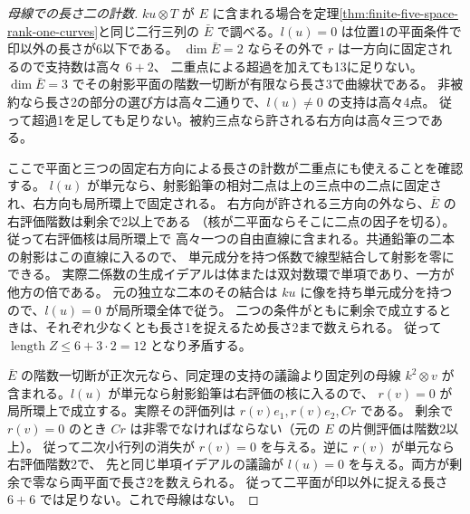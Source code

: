 \begin{proof}[母線での長さ二の計数]
$ku\otimes T$ が $E$ に含まれる場合を定理\ref{thm:finite-five-space-rank-one-curves}と同じ二行三列の
$\bar E$ で調べる。$l(u)=0$ は位置1の平面条件で印以外の長さが6以下である。
$\dim\bar E=2$ ならその外で $r$ は一方向に固定されるので支持数は高々 $6+2$、
二重点による超過を加えても13に足りない。
$\dim\bar E=3$ でその射影平面の階数一切断が有限なら長さ3で曲線状である。
非被約なら長さ2の部分の選び方は高々二通りで、$l(u)\ne0$ の支持は高々4点。
従って超過1を足しても足りない。被約三点なら許される右方向は高々三つである。

ここで平面と三つの固定右方向による長さの計数が二重点にも使えることを確認する。
$l(u)$ が単元なら、射影鉛筆の相対二点は上の三点中の二点に固定され、右方向も局所環上で固定される。
右方向が許される三方向の外なら、$\bar E$ の右評価階数は剰余で2以上である
（核が二平面ならそこに二点の因子を切る）。従って右評価核は局所環上で
高々一つの自由直線に含まれる。共通鉛筆の二本の射影はこの直線に入るので、
単元成分を持つ係数で線型結合して射影を零にできる。
実際二係数の生成イデアルは体または双対数環で単項であり、一方が他方の倍である。
元の独立な二本のその結合は $ku$ に像を持ち単元成分を持つので、$l(u)=0$ が局所環全体で従う。
二つの条件がともに剰余で成立するときは、それぞれ少なくとも長さ1を捉えるため長さ2まで数えられる。
従って $\operatorname{length}Z\le6+3\cdot2=12$ となり矛盾する。

$\bar E$ の階数一切断が正次元なら、同定理の支持の議論より固定列の母線
$k^2\otimes v$ が含まれる。$l(u)$ が単元なら射影鉛筆は右評価の核に入るので、
$r(v)=0$ が局所環上で成立する。実際その評価列は $r(v)e_1,r(v)e_2,Cr$ である。
剰余で $r(v)=0$ のとき $Cr$ は非零でなければならない（元の $E$ の片側評価は階数2以上）。
従って二次小行列の消失が $r(v)=0$ を与える。逆に $r(v)$ が単元なら右評価階数2で、
先と同じ単項イデアルの議論が $l(u)=0$ を与える。両方が剰余で零なら両平面で長さ2を数えられる。
従って二平面が印以外に捉える長さ $6+6$ では足りない。これで母線はない。
\end{proof}
